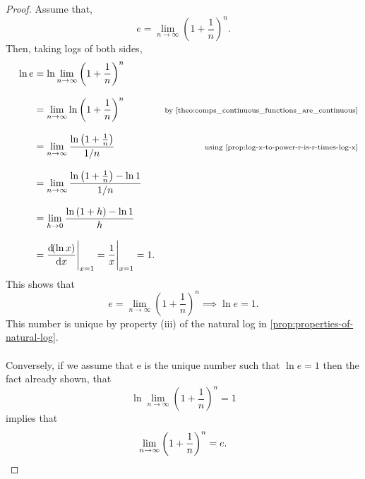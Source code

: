 \documentclass[MathsNotesBase.tex]{subfiles}
\begin{document}
{	\bigskip\bigskip
	\begin{proof} Assume that,
		\[ e = \lim_{n \to \infty} \left(1 + \frac{1}{n}\right)^n. \]
		Then, taking logs of both sides,
		\begin{align*}
		&& \ln{e} &= \ln{\lim_{n \to \infty} \left(1 + \frac{1}{n}\right)^n} \\[8pt]
		&&  &= \lim_{n \to \infty} \ln{\left(1 + \frac{1}{n}\right)^n} &\sidecomment{by \autoref{theo:comps_continuous_functions_are_continuous}} \\[8pt]
		&&  &= \lim_{n \to \infty} \frac{\ln{\left(1 + \frac{1}{n}\right)}}{1/n} &\sidecomment{using \autoref{prop:log-x-to-power-r-is-r-times-log-x}} \\[8pt]
		&&  &= \lim_{n \to \infty} \frac{\ln{\left(1 + \frac{1}{n}\right)} - \ln{1}}{1/n} &\sidecomment{} \\[8pt]
		&&  &= \lim_{h \to 0} \frac{\ln{\left(1 + h\right)} - \ln{1}}{h} &\sidecomment{} \\[8pt]
		&&  &= \eval{\frac{\dif(\ln{x})}{\dif x}}_{x=1} = \eval{\frac{1}{x}}_{x=1} = 1. &\sidecomment{}
		\end{align*}
		This shows that 
		\[ e = \lim_{n \to \infty} \left(1 + \frac{1}{n}\right)^n \implies \ln{e} = 1. \]
		This number is unique by property (iii) of the natural log in \autoref{prop:properties-of-natural-log}.\\\\
		
		Conversely, if we assume that e is the unique number such that ${ \ln{e} = 1 }$ then the fact already shown, that 
		\[ \ln{\lim_{n \to \infty} \left(1 + \frac{1}{n}\right)^n} = 1 \]
		implies that 
		\[ \lim_{n \to \infty} \left(1 + \frac{1}{n}\right)^n = e. \qedhere\]
	\end{proof}

	\bigskip\bigskip\bigskip
}
\end{document}
